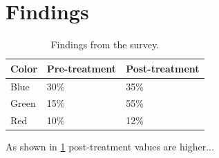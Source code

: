 \documentclass{article}
\begin{document}
\section{Findings}
\label{sec:findings}

\begin{table}[ht]
  \centering
  \begin{tabular}{lll}
    \toprule
    Color & Pre-treatment & Post-treatment \\
    \midrule
    Blue  & 30\% & 35\% \\
    Green & 15\% & 55\% \\
    Red   & 10\% & 12\% \\
    \bottomrule
  \end{tabular}
  \caption{Findings from the survey.}
  \label{tab:findings}
\end{table}

As shown in \cref{tab:findings} post-treatment values are higher...
\end{document}
